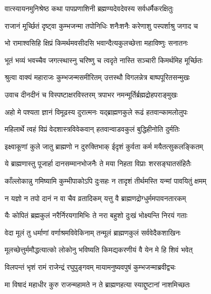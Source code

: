 \twolineshloka
{वात्स्यायनमुनिश्रेष्ठ कथा पापप्रणाशिनी}
{ब्रह्मण्यदेवदेवस्य सर्वधर्मैकरक्षितुः}%

\twolineshloka
{राजानं मूर्च्छितं दृष्ट्वा कुम्भजन्मा तपोनिधिः}
{शनैःशनैः करेणाशु पस्पर्शाश्रु जगाद च}%

\twolineshloka
{भो रामाश्वसिहि क्षिप्रं किमर्थमवसीदसि}
{भवान्दैत्यकुलच्छेत्ता महाविष्णुः सनातनः}%

\twolineshloka
{भूतं भव्यं भवच्चैव जगत्स्थास्नु चरिष्णु च}
{त्वदृते नास्ति सञ्चारी किमर्थमिह मूर्च्छितः}%

\twolineshloka
{श्रुत्वा वाक्यं महाराजः कुम्भजन्मसमीरितम्}
{उत्तस्थौ विगलन्नेत्र बाष्पपूरितसन्मुखः}%

\twolineshloka
{उवाच दीनदीनं च विस्पष्टाक्षरविस्तरम्}
{त्रपाभर नमन्मूर्तिर्ब्रह्मद्रोहपराङ्मुखः}%


\twolineshloka
{अहो मे पश्यता ज्ञानं विमूढस्य दुरात्मनः}
{यद्ब्राह्मणकुले रूढं हतवान्कामलोलुपः}%

\twolineshloka
{महिलार्थे त्वहं विप्रं वेदशास्त्रविवेकवान्}
{हतवान्वाडवकुलं बुद्धिहीनोति दुर्मतिः}%

\twolineshloka
{इक्ष्वाकूणां कुले जातु ब्राह्मणो न दुरुक्तिभाक्}
{ईदृशं कुर्वता कर्म मयैतत्सुकलङ्कितम्}%

\twolineshloka
{ये ब्राह्मणास्तु पूजार्हा दानसम्मानभोजनैः}
{ते मया निहता विप्राः शरसङ्घातसंहितैः}%

\twolineshloka
{काँल्लोकान्नु गमिष्यामि कुम्भीपाकोऽपि दुःसहः}
{न तादृशं तीर्थमस्ति यन्मां पावयितुं क्षमम्}%

\twolineshloka
{न यज्ञो न तपो दानं न वा चैव व्रतादिकम्}
{यत्तु वै ब्राह्मणद्रोग्धुर्ममपावनतारकम्}%

\twolineshloka
{यैः कोपितं ब्रह्मकुलं नरैर्निरयगामिभिः}
{ते नरा बहुशो दुःखं भोक्ष्यन्ति निरयं गताः}%

\twolineshloka
{वेदा मूलं तु धर्माणां वर्णाश्रमविवेकिनाम्}
{तन्मूलं ब्राह्मणकुलं सर्ववेदैकशाखिनः}%

\twolineshloka
{मूलच्छेत्तुर्ममौद्धत्यात्को लोकोनु भविष्यति}
{किमद्यकरणीयं वै येन मे हि शिवं भवेत्}%


\twolineshloka
{विलपन्तं भृशं रामं राजेन्द्रं रघुपुङ्गवम्}
{मायामनुष्यवपुषं कुम्भजन्माब्रवीद्वचः}%


\twolineshloka
{मा विषादं महाधीर कुरु राजन्महामते}
{न ते ब्राह्मणहत्या स्याद्दुष्टानां नाशमिच्छतः}%

